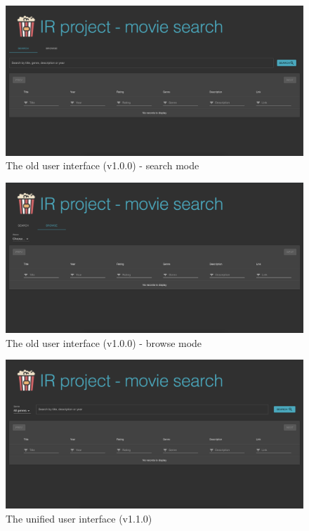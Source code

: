 \documentclass[12pt]{article}
\begin{document}
	\begin{figure}[H]
		\centering
		\includegraphics[width=\textwidth]{img/interfaceOld1.png}		
		\caption{The old user interface (v1.0.0) - search mode}
		\label{fig:interfaceOld1}
	\end{figure}
	
	\begin{figure}[H]
		\centering
		\includegraphics[width=\textwidth]{img/interfaceOld2.png}
		\caption{The old user interface (v1.0.0) - browse mode}
		\label{fig:interfaceOld2}
	\end{figure}
	
	\begin{figure}[H]
		\centering
		\includegraphics[width=\textwidth]{img/interface.png}
		\caption{The unified user interface (v1.1.0)}
		\label{fig:interface}
	\end{figure}
	
\end{document}
